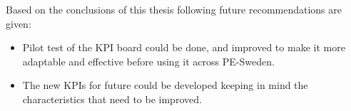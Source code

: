 \begin{enumerate}
Based on the conclusions of this thesis following future recommendations are given:
\begin{itemize}
    \item Pilot test of the KPI board could be done, and improved to make it more adaptable and effective before using it across PE-Sweden.
    \item The new KPIs for future could be developed keeping in mind the characteristics that need to be improved.
\end{itemize}

\end{enumerate}


